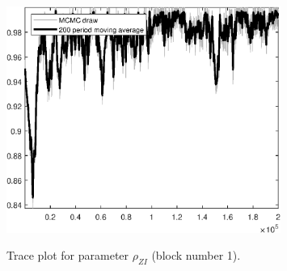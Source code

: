 \begin{figure}[H]
\centering
  \includegraphics[width=0.8\textwidth]{BRS_sectoral_rest/graphs/TracePlot_rho_ZI_blck_1}\\
    \caption{Trace plot for parameter ${\rho_{ZI}}$ (block number 1).}
\end{figure}
